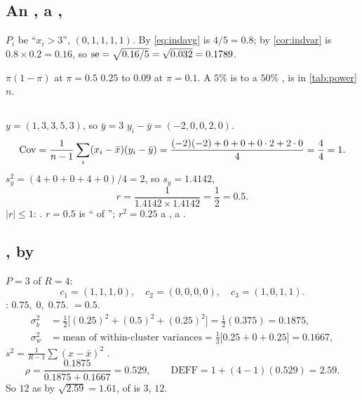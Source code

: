 \subsection{An , a ,   }
 $P_i$ be ``$x_i > 3$'',   $(0,1,1,1,1)$. By \cref{eq:indavg}
  is $4/5 = 0.8$; by \cref{cor:indvar}   is
$0.8 \times 0.2 = 0.16$, so
$\operatorname{se} = \sqrt{0.16/5} = \sqrt{0.032} = 0.1789$.

 $\pi(1-\pi)$  at
$\pi=0.5$   $0.25$   to $0.09$ at $\pi=0.1$. A $5\%$  
is    to    a $50\%$ ,  is  
 in \cref{tab:power}     $n$.

\subsection{  }
 $y=(1,3,3,5,3)$, so $\bar y = 3$  $y_i - \bar y = (-2,0,0,2,0)$.
\[
\operatorname{Cov} = \frac{1}{n-1}\sum_i (x_i-\bar x)(y_i-\bar y)
=\frac{(-2)(-2)+0+0+0\cdot 2+2\cdot 0}{4}
=\frac{4}{4}=1 .
\]
$s_y^2 = (4+0+0+4+0)/4 = 2$, so $s_y=1.4142$, 
\[
r=\frac{1}{1.4142 \times 1.4142}=\frac{1}{2}=0.5 .
\]
  $|r|\le 1$: .  $r=0.5$ is \emph{} `` of
'';  $r^2=0.25$  a  ,    a  .

\subsection{  , by }
 $P=3$  of $R=4$:
\[
c_1=(1,1,1,0),\quad c_2=(0,0,0,0),\quad c_3=(1,0,1,1).
\]
 : $0.75,\;0,\;0.75$.   $= 0.5$.
\begin{align*}
\sigma_b^2 &= \tfrac{1}{2}\big[(0.25)^2+(0.5)^2+(0.25)^2\big] = \tfrac{1}{2}(0.375)=0.1875,\\
\sigma_w^2 &= \text{mean of within-cluster variances} = \tfrac{1}{3}\big[0.25+0+0.25\big]=0.1667,
\end{align*}
 $s^2 = \tfrac{1}{R-1}\sum (x-\bar x)^2$   .
\[
\rho=\frac{0.1875}{0.1875+0.1667}=0.529,\qquad
\mathrm{DEFF}=1+(4-1)(0.529)=2.59 .
\]
So   $12$  as       by
$\sqrt{2.59}=1.61$,     of   is $3$,  $12$.

